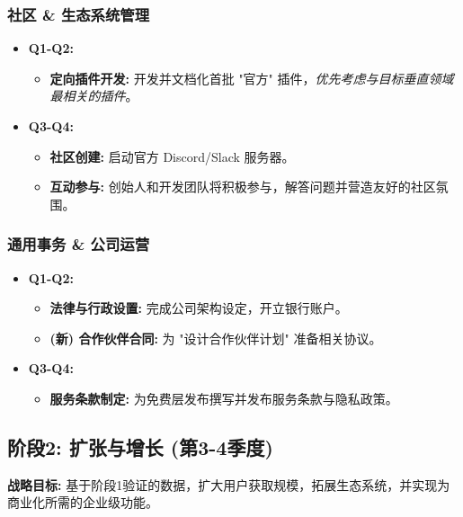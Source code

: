 \documentclass[11pt, a4paper, oneside]{article}
\begin{document}
\subsubsection{社区 \& 生态系统管理}
\begin{itemize}[leftmargin=*]
    \item \textbf{Q1-Q2:}
    \begin{itemize}
        \item \textbf{定向插件开发:} 开发并文档化首批 "官方" 插件，\textit{优先考虑与目标垂直领域最相关的插件}。
    \end{itemize}
    \item \textbf{Q3-Q4:}
    \begin{itemize}
        \item \textbf{社区创建:} 启动官方 Discord/Slack 服务器。
        \item \textbf{互动参与:} 创始人和开发团队将积极参与，解答问题并营造友好的社区氛围。
    \end{itemize}
\end{itemize}

\subsubsection{通用事务 \& 公司运营}
\begin{itemize}[leftmargin=*]
    \item \textbf{Q1-Q2:}
    \begin{itemize}
        \item \textbf{法律与行政设置:} 完成公司架构设定，开立银行账户。
        \item \textbf{(新) 合作伙伴合同:} 为 "设计合作伙伴计划" 准备相关协议。
    \end{itemize}
    \item \textbf{Q3-Q4:}
    \begin{itemize}
        \item \textbf{服务条款制定:} 为免费层发布撰写并发布服务条款与隐私政策。
    \end{itemize}
\end{itemize}

\clearpage

\subsection{阶段2: 扩张与增长 (第3-4季度)}
\textbf{战略目标:} 基于阶段1验证的数据，扩大用户获取规模，拓展生态系统，并实现为商业化所需的企业级功能。
\end{document}
